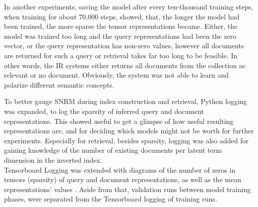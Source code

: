 In another experiments, saving the model after every ten-thousand training steps, when training for about 70,000 steps, 
    showed, that, the longer the model had been trained, the more sparse the tensor representations became.
Either, the model was trained too long and the query representations had been the zero vector,
    or the query representation has non-zero values, however all documents are returned for such a query or 
    retrieval takes far too long to be feasible.
In other words, the IR systems either returns all documents from the collection as relevant or no document.
Obviously, the system was not able to learn and polarize different semantic concepts.

To better gauge SNRM during index construction and retrieval, Python logging was expanded,
    to log the sparsity of inferred query and document representations.
This showed useful to get a glimpse of how useful resulting representations are, and for deciding
    which models might not be worth for further experiments.
Especially for retrieval, besides sparsity, logging was also added for gaining knowledge of
    the number of existing documents per latent term dimension in the inverted index. \\
Tensorboard Logging was extended with diagrams of the number of zeros in tensors (sparsity) of 
    query and document representations, as well as the mean representations' values .
Aside from that, validation runs between model training phases, were separated from the Tensorboard logging 
    of training runs.

